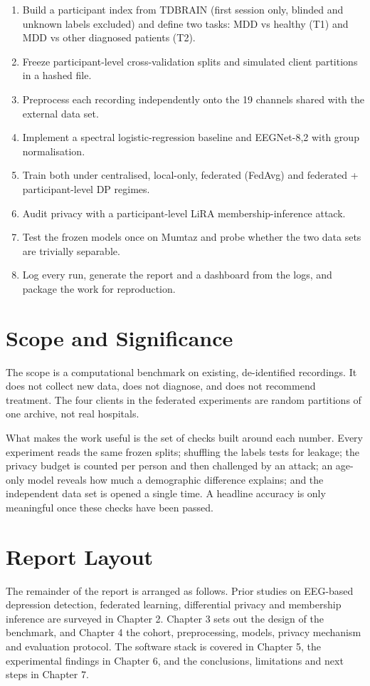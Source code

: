 \documentclass[12pt,a4paper,oneside]{report}
\begin{document}
\begin{enumerate}[leftmargin=1.6em,itemsep=2pt,topsep=2pt]
\item Build a participant index from TDBRAIN (first session only, blinded and unknown labels excluded) and define two tasks: MDD vs healthy (T1) and MDD vs other diagnosed patients (T2).
\item Freeze participant-level cross-validation splits and simulated client partitions in a hashed file.
\item Preprocess each recording independently onto the 19 channels shared with the external data set.
\item Implement a spectral logistic-regression baseline and EEGNet-8,2 with group normalisation.
\item Train both under centralised, local-only, federated (FedAvg) and federated + participant-level DP regimes.
\item Audit privacy with a participant-level LiRA membership-inference attack.
\item Test the frozen models once on Mumtaz and probe whether the two data sets are trivially separable.
\item Log every run, generate the report and a dashboard from the logs, and package the work for reproduction.
\end{enumerate}

\section{Scope and Significance}
The scope is a computational benchmark on existing, de-identified recordings. It does not collect new data, does not diagnose, and does not recommend treatment. The four clients in the federated experiments are random partitions of one archive, not real hospitals.

What makes the work useful is the set of checks built around each number. Every experiment reads the same frozen splits; shuffling the labels tests for leakage; the privacy budget is counted per person and then challenged by an attack; an age-only model reveals how much a demographic difference explains; and the independent data set is opened a single time. A headline accuracy is only meaningful once these checks have been passed.


\section{Report Layout}
The remainder of the report is arranged as follows. Prior studies on EEG-based depression detection, federated learning, differential privacy and membership inference are surveyed in Chapter 2. Chapter 3 sets out the design of the benchmark, and Chapter 4 the cohort, preprocessing, models, privacy mechanism and evaluation protocol. The software stack is covered in Chapter 5, the experimental findings in Chapter 6, and the conclusions, limitations and next steps in Chapter 7.
\end{document}
